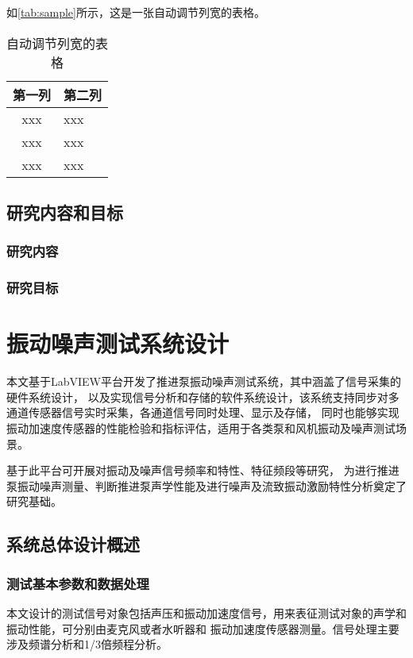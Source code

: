 \par 如\autoref{tab:sample}所示，这是一张自动调节列宽的表格。

\begin{table}[htbp]
    \caption{\label{tab:sample}自动调节列宽的表格}
    \begin{tabularx}{\linewidth}{c|X<{\centering}}
        \hline
        第一列 & 第二列 \\ \hline
        xxx & xxx \\ \hline
        xxx & xxx \\ \hline
        xxx & xxx \\ \hline
    \end{tabularx}
\end{table}
\section{研究内容和目标}
\subsection{研究内容}
\subsection{研究目标}

\chapter{振动噪声测试系统设计}
本文基于LabVIEW平台开发了推进泵振动噪声测试系统，其中涵盖了信号采集的硬件系统设计，
以及实现信号分析和存储的软件系统设计，该系统支持同步对多通道传感器信号实时采集，各通道信号同时处理、显示及存储，
同时也能够实现振动加速度传感器的性能检验和指标评估，适用于各类泵和风机振动及噪声测试场景。

基于此平台可开展对振动及噪声信号频率和特性、特征频段等研究，
为进行推进泵振动噪声测量、判断推进泵声学性能及进行噪声及流致振动激励特性分析奠定了研究基础。

\section{系统总体设计概述}

\subsection{测试基本参数和数据处理}
本文设计的测试信号对象包括声压和振动加速度信号，用来表征测试对象的声学和振动性能，可分别由麦克风或者水听器和
振动加速度传感器测量。信号处理主要涉及频谱分析和1/3倍频程分析。

